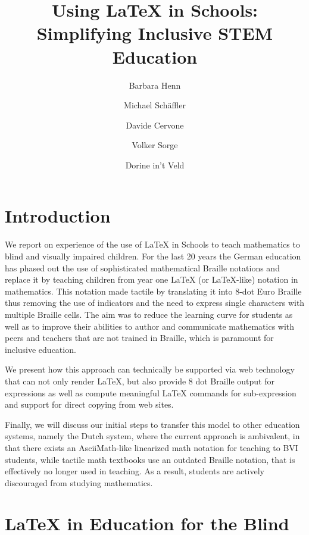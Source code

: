 \documentclass{easychair}
\begin{document}
\title{Using {\LaTeX} in Schools: Simplifying Inclusive STEM Education}

\author[1]{Barbara Henn\and Michael Schäffler\and Davide Cervone \and Volker Sorge\and
  Dorine in't Veld}

\date{}
\maketitle


\section{Introduction}\label{sec:intro}

We report on experience of the use of {\LaTeX} in Schools to teach mathematics
to blind and visually impaired children. For the last 20 years the German
education has phased out the use of sophisticated mathematical Braille notations
and replace it by teaching children from year one {\LaTeX} (or {\LaTeX}-like)
notation in mathematics. This notation made tactile by translating it into 8-dot
Euro Braille thus removing the use of indicators and the need to express single
characters with multiple Braille cells. The aim was to reduce the learning curve
for students as well as to improve their abilities to author and communicate
mathematics with peers and teachers that are not trained in Braille, which is
paramount for inclusive education.

We present how this approach can technically be supported via web technology that
can not only render {\LaTeX}, but also provide 8 dot Braille output for expressions
as well as compute meaningful {\LaTeX} commands for sub-expression and support for
direct copying from web sites.

Finally, we will discuss our initial steps to transfer this model to other
education systems, namely the Dutch system, where the current approach is
ambivalent, in that there exists an AsciiMath-like linearized math notation for
teaching to BVI students, while tactile math textbooks use an outdated Braille
notation, that is effectively no longer used in teaching.  As a result, students
are actively discouraged from studying mathematics.

\section{{\LaTeX} in Education for the Blind}\label{sec:latex-in-schools}
\end{document}
